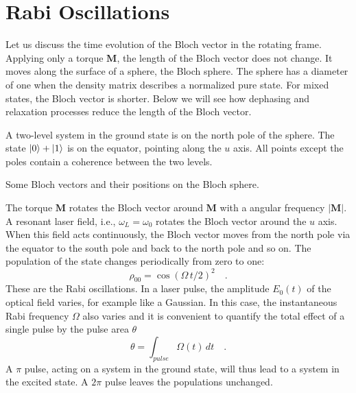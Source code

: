 \section{Rabi Oscillations}

Let us discuss the time evolution of the Bloch vector in the rotating frame. Applying only a torque $\boldsymbol{M}$, the length of the Bloch vector does not change. It moves along the surface of a sphere, the Bloch sphere. The sphere has a diameter of one when the density matrix describes a normalized pure state. For mixed states, the Bloch vector is shorter. Below we will see how dephasing and relaxation processes reduce the length of the Bloch vector.


A two-level system in the ground state is on the north pole of the sphere. The state $\ket{0} + \ket{1}$ is on the equator, pointing along the $u$ axis. All points except the poles contain a coherence between the two levels.


\begin{marginfigure}
\centering

\caption{Some Bloch vectors and their positions on the Bloch sphere.}
\end{marginfigure}


The torque $\boldsymbol{M}$ rotates the Bloch vector around  $\boldsymbol{M}$ with a angular frequency  $|\boldsymbol{M}|$. A resonant laser field, i.e., $\omega_L = \omega_0$ rotates the Bloch vector around the $u$ axis. When this field acts continuously, the Bloch vector moves from the north pole via the equator to the south pole and back to the north pole and so on. The population of the state changes periodically from zero to one:
\begin{equation}
 \rho_{00} = \cos ( \Omega \, t / 2)^2 \quad .
\end{equation}
These are the Rabi oscillations. In a laser pulse, the amplitude $E_0(t)$ of the optical field varies, for example like a Gaussian. In this case, the instantaneous Rabi frequency $\Omega$ also varies and it is convenient to quantify the total effect of a single pulse by the pulse area $\theta$
\begin{equation}
 \theta = \int_{pulse} \Omega (t) \, dt \quad .
\end{equation}
A $\pi$ pulse, acting on a system in the ground state, will thus lead to a system in the excited state. A $2\pi$ pulse leaves the populations unchanged.



